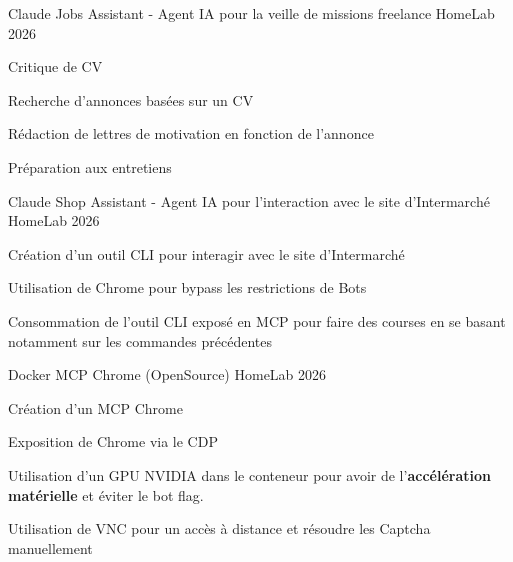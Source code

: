 

\begin{cventries}

	\cventry
	{Claude}
	{Jobs Assistant - Agent IA pour la veille de missions freelance}
	{HomeLab}
	{2026}
	{
		\begin{cvitems} %
			\item {Critique de CV}
			\item {Recherche d'annonces basées sur un CV}
			\item {Rédaction de lettres de motivation en fonction de l'annonce}
			\item {Préparation aux entretiens}
		\end{cvitems}
	}

	\cventry
	{Claude}
	{Shop Assistant - Agent IA pour l'interaction avec le site d'Intermarché}
	{HomeLab}
	{2026}
	{
		\begin{cvitems} %
			\item {Création d'un outil CLI pour interagir avec le site d'Intermarché}
			\item {Utilisation de Chrome pour bypass les restrictions de Bots}
			\item {Consommation de l'outil CLI exposé en MCP pour faire des courses en se basant notamment sur les commandes précédentes}
		\end{cvitems}
	}

	\cventry
	{Docker}
	{MCP Chrome (OpenSource)}
	{HomeLab}
	{2026}
	{
		\begin{cvitems} %
			\item {Création d'un MCP Chrome}
			\item {Exposition de Chrome via le CDP}
			\item {Utilisation d'un GPU NVIDIA dans le conteneur pour avoir de l'\textbf{accélération matérielle} et éviter le bot flag.}
			\item {Utilisation de VNC pour un accès à distance et résoudre les Captcha manuellement}
		\end{cvitems}
	}


\end{cventries}
